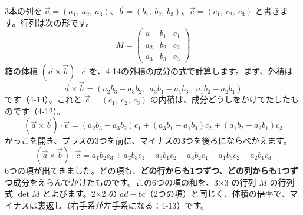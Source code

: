 3本の列を $\vec a=(a_1,\ a_2,\ a_3)$、$\vec b=(b_1,\ b_2,\ b_3)$、$\vec c=(c_1,\ c_2,\ c_3)$ と書きます。行列は次の形です。
\[ M=\begin{pmatrix}a_1&b_1&c_1\\a_2&b_2&c_2\\a_3&b_3&c_3\end{pmatrix} \]
箱の体積 $(\vec a\times\vec b)\cdot\vec c$ を、4-14の外積の成分の式で計算します。まず、外積は
\[ \vec a\times\vec b=(a_2b_3-a_3b_2,\ \ a_3b_1-a_1b_3,\ \ a_1b_2-a_2b_1) \]
です（4-14）。これと $\vec c=(c_1,\ c_2,\ c_3)$ の内積は、成分どうしをかけてたしたものです（4-12）。
\[ (\vec a\times\vec b)\cdot\vec c=(a_2b_3-a_3b_2)c_1+(a_3b_1-a_1b_3)c_2+(a_1b_2-a_2b_1)c_3 \]
かっこを開き、プラスの3つを前に、マイナスの3つを後ろにならべかえます。
\[ (\vec a\times\vec b)\cdot\vec c=a_1b_2c_3+a_2b_3c_1+a_3b_1c_2-a_3b_2c_1-a_1b_3c_2-a_2b_1c_3 \]
6つの項が出てきました。どの項も、\textbf{どの行からも1つずつ、どの列からも1つずつ}成分をえらんでかけたものです。この6つの項の和を、3×3 の行列 $M$ の行列式 $\det M$ とよびます。2×2 の $ad-bc$（2つの項）と同じく、体積の倍率で、マイナスは裏返し（右手系が左手系になる：4-13）です。

